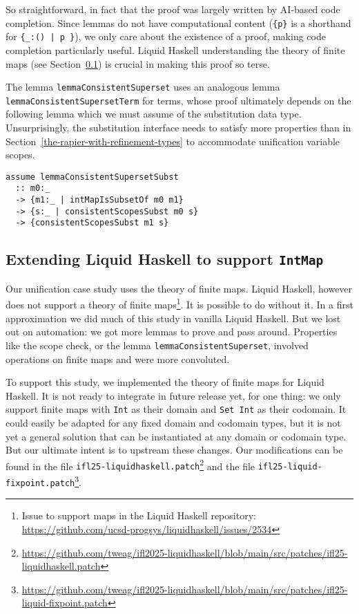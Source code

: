 \documentclass[sigconf, review]{acmart}
\newcommand{\tc}[1]{{\small\texttt{#1}}}
\newcommand{\patchfile}[1]{\tc{#1}\footnote{\scriptsize\url{https://github.com/tweag/ifl2025-liquidhaskell/blob/main/src/patches/#1}}}
\newtheorem{principle}{Principle}
\begin{document}
So straightforward, in fact that the proof was largely written by AI-based code
completion. Since lemmas do not have computational content (\tc{\{p\}} is a
shorthand for \tc{\{\_:() | p \}}), we only care about the existence of a
proof, making code completion particularly useful. Liquid Haskell understanding
the theory of finite maps (see Section~\ref{extending-liquid-haskell}) is crucial in
making this proof so terse.

The lemma \tc{lemmaConsistentSuperset} uses an analogous lemma \tc{lemma\-Consistent\-Superset\-Term} for terms,
whose proof ultimately depends on the following lemma which we must assume of the substitution data type.
Unsurprisingly, the substitution interface needs to satisfy more properties
than in Section~\ref{the-rapier-with-refinement-types} to accommodate
unification variable scopes.

\begin{verbatim}
assume lemmaConsistentSupersetSubst
  :: m0:_
  -> {m1:_ | intMapIsSubsetOf m0 m1}
  -> {s:_ | consistentScopesSubst m0 s}
  -> {consistentScopesSubst m1 s}
\end{verbatim}

\subsection{Extending Liquid Haskell to support \tc{IntMap}}
\label{extending-liquid-haskell}

Our unification case study uses the theory of finite maps. Liquid Haskell,
however does not support a theory of finite maps\footnote{Issue to support maps in
  the Liquid Haskell repository:
  \url{https://github.com/ucsd-progsys/liquidhaskell/issues/2534}}. It is
possible to do without it. In a first approximation we did much of this study in
vanilla Liquid Haskell. But we lost out on automation: we got more lemmas to prove
and pass around. Properties like the scope check, or the lemma
\tc{lemmaConsistentSuperset}, involved operations on finite maps and were more
convoluted.



To support this study, we implemented the theory of finite maps for Liquid
Haskell. It is not ready to integrate in future release yet, for one thing: we only support finite
maps with \tc{Int} as their domain and \tc{Set Int} as their codomain. It could easily be adapted for any fixed
domain and codomain types, but it is not yet a general solution that can be instantiated at any
domain or codomain type. But our ultimate intent is to upstream these changes. Our
modifications can be found in the file \patchfile{ifl25-liquidhaskell.patch} and the file \patchfile{ifl25-liquid-fixpoint.patch}.
\end{document}
